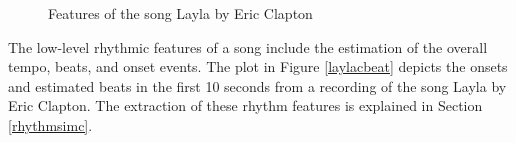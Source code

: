 \begin{figure}[htbp]
	\centering
	\caption{Features of the song Layla by Eric Clapton}
	\label{fig:feat1}
\end{figure}

\noindent The low-level rhythmic features of a song include the estimation of the overall tempo, beats, and onset events. 
The plot in Figure \ref{laylacbeat} depicts the onsets and estimated beats in the first 10 seconds from a recording of the song Layla by Eric Clapton. The extraction of these rhythm features is explained in Section \ref{rhythmsimc}.



